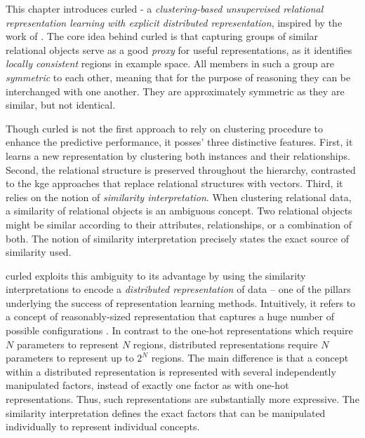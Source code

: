This chapter introduces \gls{curled} - a \textit{clustering-based unsupervised relational representation learning with explicit distributed representation}, inspired by the work of \cite{coates2011analysis}.
The core idea behind \gls{curled} is that capturing groups of similar relational objects serve as a good \textit{proxy} for useful representations, as it identifies \textit{locally consistent} regions in example space.
All members in such a group are \textit{symmetric} to each other, meaning that for the purpose of reasoning they can be interchanged with one another.
They are approximately symmetric as they are similar, but not identical.



Though \gls{curled} is not the first approach to rely on clustering procedure to enhance the predictive performance, it posses' three distinctive features.
First, it learns a new representation by clustering both instances and their relationships.
Second, the relational structure is  preserved throughout the hierarchy, contrasted to the \gls{kge} approaches that replace relational structures with vectors.
Third, it relies on the notion of \textit{similarity interpretation}.
When clustering relational data, a similarity of relational objects is an ambiguous concept.
Two relational objects might be similar according to their attributes, relationships, or a combination of both.
The notion of similarity interpretation precisely states the exact source of similarity used.



\gls{curled} exploits this ambiguity to its advantage by using the similarity interpretations to encode a \textit{distributed representation} of data -- one of the pillars underlying the success of representation learning methods.
Intuitively, it refers to a concept of  reasonably-sized representation that captures a huge number of possible configurations \cite{Bengio2013RLR}.
In contrast to the one-hot representations which require $N$ parameters to represent $N$ regions,  distributed representations require $N$ parameters to represent up to $2^N$ regions.
The main difference is that a concept within a distributed representation is represented with several independently manipulated factors, instead of exactly one factor as with one-hot representations.
Thus, such representations are substantially more expressive.
The similarity interpretation defines the exact factors that can be manipulated individually to represent individual concepts.



